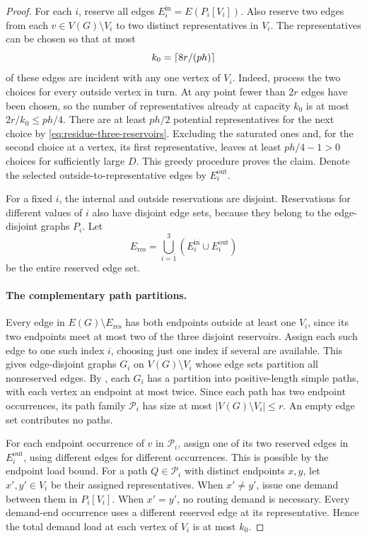 \begin{proof}
For each $i$, reserve all edges
$E_i^{\mathrm{in}}=E(P_i[V_i])$.  Also reserve two edges from each
$v\in V(G)\setminus V_i$ to two distinct representatives in $V_i$.
The representatives can be chosen so that at most
\begin{equation}\label{eq:residue-representative-capacity}
  k_0=\left\lceil8r/(ph)\right\rceil
\end{equation}
of these edges are incident with any one vertex of $V_i$.
Indeed, process the two choices for every outside vertex in turn.
At any point fewer than $2r$ edges have been chosen, so the number
of representatives already at capacity $k_0$ is at most
$2r/k_0\le ph/4$.  There are at least $ph/2$ potential
representatives for the next choice by
\eqref{eq:residue-three-reservoirs}.  Excluding the saturated ones
and, for the second choice at a vertex, its first representative,
leaves at least $ph/4-1>0$ choices for sufficiently large $D$.
This greedy procedure proves the claim.  Denote the selected
outside-to-representative edges by $E_i^{\mathrm{out}}$.

For a fixed $i$, the internal and outside reservations are disjoint.
Reservations for different values of $i$ also have disjoint edge
sets, because they belong to the edge-disjoint graphs $P_i$.
Let
\[
  E_{\mathrm{res}}=
     \bigcup_{i=1}^3(E_i^{\mathrm{in}}\cup E_i^{\mathrm{out}})
\]
be the entire reserved edge set.

\paragraph{The complementary path partitions.}
Every edge in $E(G)\setminus E_{\mathrm{res}}$ has both endpoints
outside at least one $V_i$, since its two endpoints meet at most two
of the three disjoint reservoirs.  Assign each such edge to one
such index $i$, choosing just one index if several are available.
This gives edge-disjoint graphs $G_i$ on $V(G)\setminus V_i$ whose
edge sets partition all nonreserved edges.
By , each $G_i$ has a partition into
positive-length simple paths, with each vertex an endpoint at most
twice.  Since each path has two endpoint occurrences, its path
family $\mathcal P_i$ has size at most $|V(G)\setminus V_i|\le r$.
An empty edge set contributes no paths.

For each endpoint occurrence of $v$ in $\mathcal P_i$, assign one
of its two reserved edges in $E_i^{\mathrm{out}}$, using different
edges for different occurrences.  This is possible by the endpoint
load bound.  For a path $Q\in\mathcal P_i$ with distinct endpoints
$x,y$, let $x',y'\in V_i$ be their assigned representatives.
When $x'\ne y'$, issue one demand between them in $P_i[V_i]$.
When $x'=y'$, no routing demand is necessary.
Every demand-end occurrence uses a different reserved edge at its
representative.  Hence the total demand load at each vertex of
$V_i$ is at most $k_0$.


\end{proof}
